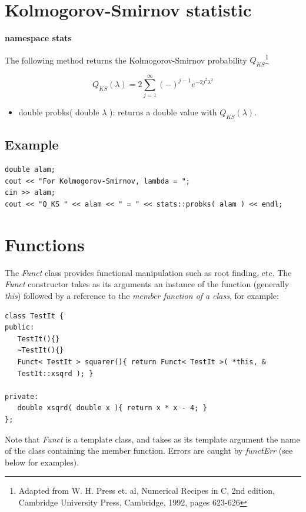 \documentclass{report}
\begin{document}
\section{Kolmogorov-Smirnov statistic}\label{ks_p}

{\bf namespace stats}

The following method returns the Kolmogorov-Smirnov
probability
$Q_{KS}$\footnote{Adapted from W. H. Press et. al, Numerical
Recipes in C, 2nd edition, Cambridge University Press, Cambridge,
1992, pages 623-626}

\begin{equation}
Q_{KS}(\lambda) = 2\sum_{j=1}^{\infty}(-)^{j-1}e^{-2j^2\lambda^2}
\end{equation}

\begin{itemize}
\item double probks( double $\lambda$ ): returns a double value with
      $Q_{KS}(\lambda)$.
\end{itemize}

\subsection{Example}
\begin{verbatim}
double alam;
cout << "For Kolmogorov-Smirnov, lambda = ";
cin >> alam;
cout << "Q_KS " << alam << " = " << stats::probks( alam ) << endl;
\end{verbatim}

\section{Functions}

The {\em Funct} class provides functional manipulation such as root
finding, etc.  The {\em Funct} constructor takes as its arguments an
instance of the function (generally {\em *this}) followed by a
reference to the {\em member function of a class}, for example:

\begin{verbatim}
class TestIt {
public:
   TestIt(){}
   ~TestIt(){}
   Funct< TestIt > squarer(){ return Funct< TestIt >( *this, &
   TestIt::xsqrd ); }

private:
   double xsqrd( double x ){ return x * x - 4; }
};
\end{verbatim}

Note that {\em Funct} is a template class, and takes as its template
argument the name of the class containing the member function.  Errors
are caught by {\em functErr} (see below for examples).
\end{document}
